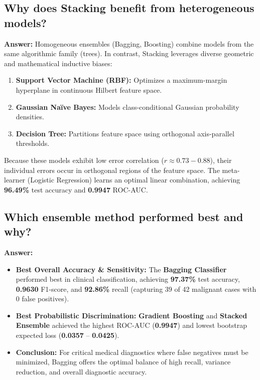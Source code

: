 \documentclass[12pt,a4paper]{article}
\begin{document}
\subsection{Why does Stacking benefit from heterogeneous models?}
\textbf{Answer:}
Homogeneous ensembles (Bagging, Boosting) combine models from the same algorithmic family (trees). In contrast, Stacking leverages diverse geometric and mathematical inductive biases:
\begin{enumerate}
\item \textbf{Support Vector Machine (RBF):} Optimizes a maximum-margin hyperplane in continuous Hilbert feature space.
\item \textbf{Gaussian Naïve Bayes:} Models class-conditional Gaussian probability densities.
\item \textbf{Decision Tree:} Partitions feature space using orthogonal axis-parallel thresholds.
\end{enumerate}
Because these models exhibit low error correlation ($r \approx 0.73 - 0.88$), their individual errors occur in orthogonal regions of the feature space. The meta-learner (Logistic Regression) learns an optimal linear combination, achieving \textbf{96.49\%} test accuracy and \textbf{0.9947} ROC-AUC.

\subsection{Which ensemble method performed best and why?}
\textbf{Answer:}
\begin{itemize}
\item \textbf{Best Overall Accuracy \& Sensitivity:} The \textbf{Bagging Classifier} performed best in clinical classification, achieving \textbf{97.37\%} test accuracy, \textbf{0.9630} F1-score, and \textbf{92.86\%} recall (capturing 39 of 42 malignant cases with 0 false positives).
\item \textbf{Best Probabilistic Discrimination:} \textbf{Gradient Boosting} and \textbf{Stacked Ensemble} achieved the highest ROC-AUC (\textbf{0.9947}) and lowest bootstrap expected loss (\textbf{0.0357} – \textbf{0.0425}).
\item \textbf{Conclusion:} For critical medical diagnostics where false negatives must be minimized, Bagging offers the optimal balance of high recall, variance reduction, and overall diagnostic accuracy.
\end{itemize}
\end{document}
